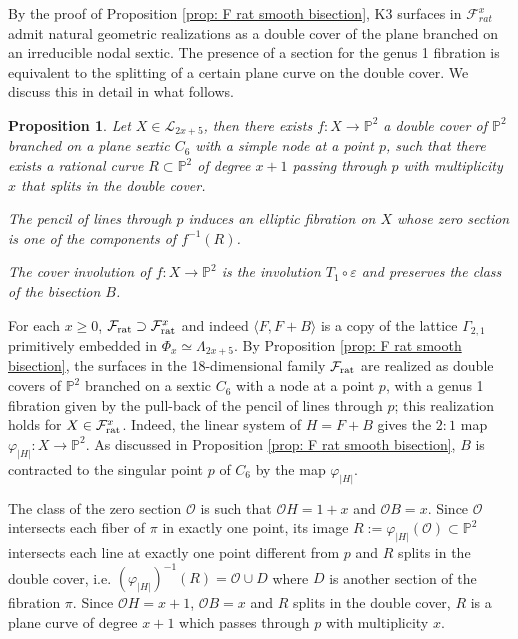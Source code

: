 \documentclass{amsart}
\newtheorem{proposition}[theorem]{Proposition}
\theoremstyle{definition}
\numberwithin{equation}{section}
\newcommand{\ra}{\rightarrow}
\begin{document}
By the proof of Proposition \ref{prop: F rat smooth bisection},  K3 surfaces in $\mathcal{F}_{rat}^x$ admit natural geometric realizations as a double cover of the plane branched on an irreducible nodal sextic. The presence of a section for the genus 1 fibration is equivalent to the splitting of a certain plane curve on the double cover. We discuss this in detail in what follows.


\begin{proposition}\label{prop: Fratx cover of P2}
Let $X\in\mathcal{L}_{2x+5}$, then there exists $f:X\ra \mathbb{P}^2$ a double cover of $\mathbb{P}^2$ branched on a plane sextic $C_6$ with a simple node at a point $p$, such that there exists a rational curve $R\subset\mathbb{P}^2$ of degree $x+1$ passing through $p$ with multiplicity $x$ that splits in the double cover.

The pencil of lines through $p$ induces an elliptic fibration on $X$ whose zero section is one of the components of $f^{-1}(R)$.

The cover involution of $f:X\ra\mathbb{P}^2$ is the involution $ T_1\circ \varepsilon$ and preserves the class of the bisection $B$.
\end{proposition}
\proof
For each $x\geq 0$, $\mathcal{F}_{\rm{rat}}\supset \mathcal{F}_{\rm{rat}}^x$ and indeed $\langle F,F+B\rangle$ is a copy of the lattice $\Gamma_{2,1}$ primitively embedded in $\Phi_x\simeq \Lambda_{2x+5}$.
By Proposition \ref{prop: F rat smooth bisection},  the surfaces in the 18-dimensional family $\mathcal{F}_{\rm{rat}}$ are realized as double covers of $\mathbb{P}^2$ branched on a sextic $C_6$ with a node at a point $p$, with a genus 1 fibration given by the pull-back of the pencil of lines through $p$; this  realization holds for $X\in\mathcal{F}_{\rm{rat}}^x$. Indeed, the linear system of $H=F+B$ gives the $2:1$ map $\varphi_{|H|}:X\ra \mathbb{P}^2$. As discussed in Proposition \ref{prop: F rat smooth bisection}, $B$ is contracted to the singular point $p$ of $C_6$ by the map $\varphi_{|H|}$. 

The class of the zero section $\mathcal{O}$ is such that $\mathcal{O}H=1+x$ and $\mathcal{O}B=x$.
Since $\mathcal{O}$ intersects each fiber of $\pi$ in exactly one point, its image  $R:=\varphi_{|H|}(\mathcal{O})\subset \mathbb{P}^2$ intersects each line at exactly one point different from $p$ and $R$ splits in the double cover, i.e. $(\varphi_{|H|})^{-1}(R)=\mathcal{O}\cup D$ where $D$ is another section of the fibration $\pi$. Since $\mathcal{O}H=x+1$, $\mathcal{O}B=x$ and $R$ splits in the double cover, $R$ is a plane curve of degree $x+1$ which passes through $p$ with multiplicity $x$. 
\end{document}
